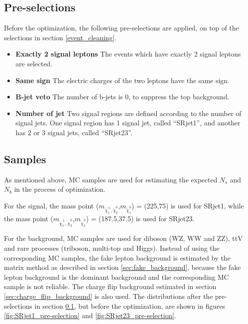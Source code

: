 \subsection{Pre-selections}
\label{sec:SR_pre-selection}
Before the optimization, the following pre-selections are applied, on top of the selections in section \ref{event_cleaning}.
\begin{itemize}
\item \textbf{Exactly 2 signal leptons} The events which have exactly 2 signal leptons are selected.
\item \textbf{Same sign} The electric charges of the two leptons have the same sign.
\item \textbf{B-jet veto} The number of b-jets is 0, to suppress the top background.
\item \textbf{Number of jet} Two signal regions are defined according to the number of signal jets. One signal region has 1 signal jet, called ``SRjet1'', and another has 2 or 3 signal jets, called ``SRjet23''.
\end{itemize}

\subsection{Samples}
As mentioned above, MC samples are used for estimating the expected $N_s$ and $N_b$ in the process of optimization.

For the signal, the mass point ($m_{\tilde{\chi}_1^\pm , \tilde{\chi}_2^0}$,$m_{\tilde{\chi}_1^0}$) = (225,75) is used for SRjet1, while the mass point ($m_{\tilde{\chi}_1^\pm , \tilde{\chi}_2^0}$,$m_{\tilde{\chi}_1^0}$) = (187.5,37.5) is used for SRjet23.

For the background, MC samples are used for diboson (WZ, WW and ZZ), ttV and rare processes (triboson, multi-top and Higgs).
Instead of using the corresponding MC samples, the fake lepton background is estimated by the matrix method as described in section \ref{sec:fake_background}, because the fake lepton background is the dominant background and the corresponding MC sample is not reliable.
The charge flip background estimated in section \ref{sec:charge_flip_background} is also used.
The distributions after the pre-selections in section \ref{sec:SR_pre-selection}, but before the optimization, are shown in figures \ref{fig:SRjet1_pre-selection} and \ref{fig:SRjet23_pre-selection}.


